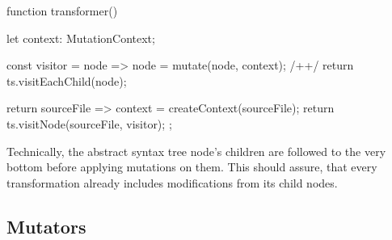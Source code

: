 \begin{program}
\caption{}
\label{prog:transformer}
\begin{JsCode}
function transformer() {
  let context: MutationContext;
  
  const visitor = node => {
    node = mutate(node, context); /+\label{prog:transformer:mutate}+/
    return ts.visitEachChild(node);
  }
  
  return sourceFile => {
    context = createContext(sourceFile);
    return ts.visitNode(sourceFile, visitor);
  };
}
\end{JsCode}
\end{program}
Technically, the abstract syntax tree node's children are followed to the very bottom before applying mutations on them. This should assure, that every transformation already includes modifications from its child nodes.


\subsection{Mutators}
\label{sec:mutators}

